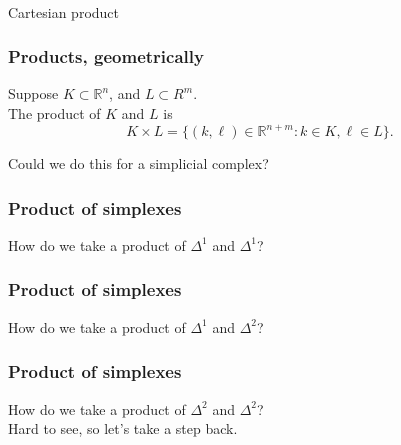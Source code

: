\documentclass[14pt]{beamer}
\newcommand{\R}{\mathbb{R}}
\begin{document}
\begin{frame}
  \vfill
  \begin{center}
    \scalebox{5}{\Huge $\times$} \\
   \vspace{2ex}Cartesian product
  \end{center}
  \vfill
\end{frame}


\begin{frame}
  \frametitle{Products, geometrically}

\begin{definition}
Suppose $K \subset \R^n$, and $L \subset R^m$. \\
The product of $K$ and $L$ is
$$
K \times L = \{ (k,\ell) \in \R^{n+m} : k \in K, \ell \in L \}.
$$
\end{definition}

\pause
\vfill
Could we do this for a simplicial complex?

\end{frame}

\begin{frame}
 \frametitle{Product of simplexes}
 How do we take a product of $\Delta^1$ and $\Delta^1$?
 \vfill
\end{frame}

\begin{frame}
\frametitle{Product of simplexes}
How do we take a product of $\Delta^1$ and $\Delta^2$?
\vfill
\end{frame}

\begin{frame}
\frametitle{Product of simplexes}
How do we take a product of $\Delta^2$ and $\Delta^2$? \\\pause
Hard to see, so let's take a step back.
\vfill
\end{frame}


\end{document}
